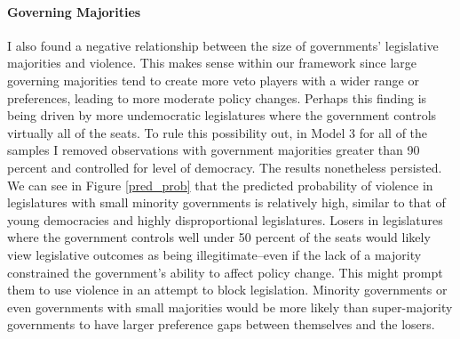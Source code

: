 \documentclass[a4paper]{article}\usepackage{graphicx, color}
\begin{document}
\paragraph{Governing Majorities}
I also found a negative relationship between the size of governments' legislative majorities and violence. This makes sense within our framework since large governing majorities tend to create more veto players with a wider range or preferences, leading to more moderate policy changes. Perhaps this finding is being driven by more undemocratic legislatures where the government controls virtually all of the seats. To rule this possibility out, in Model 3 for all of the samples I removed observations with government majorities greater than 90 percent and controlled for level of democracy. The results nonetheless persisted. We can see in Figure \ref{pred_prob} that the predicted probability of violence in legislatures with small minority governments is relatively high, similar to that of young democracies and highly disproportional legislatures. Losers in legislatures where the government controls well under 50 percent of the seats would likely view legislative outcomes as being illegitimate--even if the lack of a majority constrained the government's ability to affect policy change. This might prompt them to use violence in an attempt to block legislation. Minority governments or even governments with small majorities would be more likely than super-majority governments to have larger preference gaps between themselves and the losers. 
\end{document}
